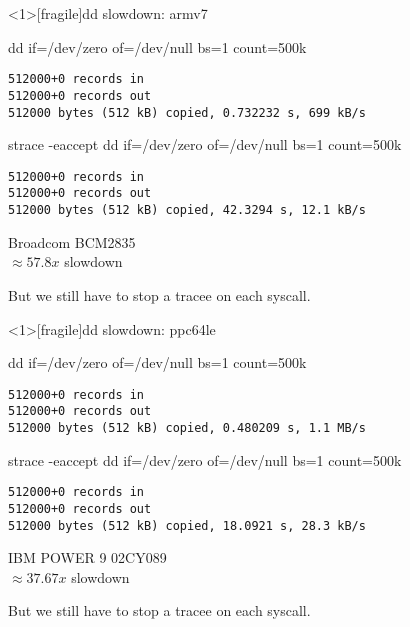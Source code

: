 \documentclass[unicode]{beamer}
\begin{document}
\begin{frame}<1>[fragile]{dd slowdown: armv7}
\begin{block}{\large dd if=/dev/zero of=/dev/null bs=1 count=500k}
\begin{verbatim}
512000+0 records in
512000+0 records out
512000 bytes (512 kB) copied, 0.732232 s, 699 kB/s
\end{verbatim}
\end{block}
\begin{block}{\large strace -eaccept dd if=/dev/zero of=/dev/null bs=1 count=500k}
\begin{verbatim}
512000+0 records in
512000+0 records out
512000 bytes (512 kB) copied, 42.3294 s, 12.1 kB/s
\end{verbatim}
\end{block}
\begin{scriptsize}
Broadcom BCM2835 \\
$\approx 57.8x$ slowdown \\
\end{scriptsize}
\pause
But we still have to stop a tracee on each syscall.
\end{frame}

\begin{frame}<1>[fragile]{dd slowdown: ppc64le}
\begin{block}{\large dd if=/dev/zero of=/dev/null bs=1 count=500k}
\begin{verbatim}
512000+0 records in
512000+0 records out
512000 bytes (512 kB) copied, 0.480209 s, 1.1 MB/s
\end{verbatim}
\end{block}
\begin{block}{\large strace -eaccept dd if=/dev/zero of=/dev/null bs=1 count=500k}
\begin{verbatim}
512000+0 records in
512000+0 records out
512000 bytes (512 kB) copied, 18.0921 s, 28.3 kB/s
\end{verbatim}
\end{block}
\begin{scriptsize}
IBM POWER 9 02CY089 \\
$\approx 37.67x$ slowdown \\
\end{scriptsize}
\pause
But we still have to stop a tracee on each syscall.
\end{frame}
\end{document}
